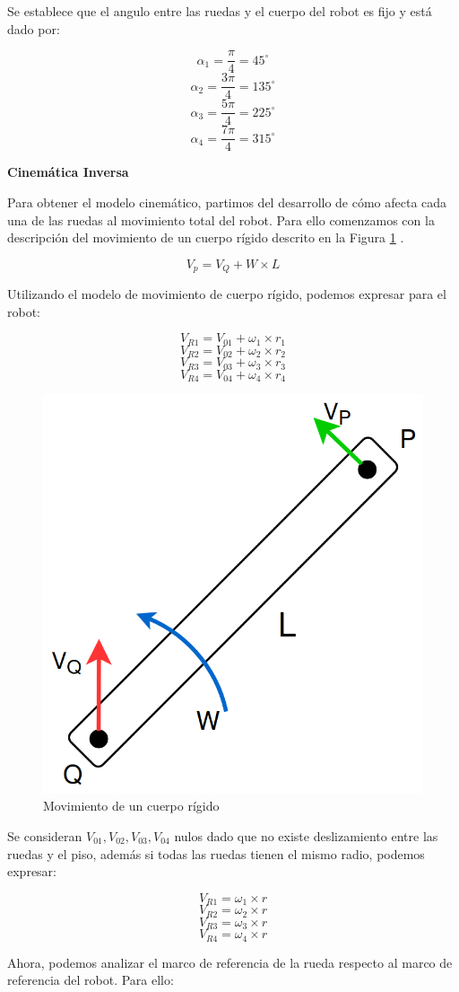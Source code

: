Se establece que el angulo entre las ruedas y el cuerpo del robot es fijo y está dado por:

$$ \alpha_1 = \frac{\pi}{4} = 45^{\circ} $$
$$ \alpha_2 = \frac{3\pi}{4} = 135^{\circ} $$
$$ \alpha_3 = \frac{5\pi}{4} = 225^{\circ} $$
$$ \alpha_4 = \frac{7\pi}{4} = 315^{\circ} $$

\newpage
\textbf{Cinemática Inversa} \mbox{} \vspace{8pt}

Para obtener el modelo cinemático, partimos del desarrollo de cómo afecta cada una de las ruedas al movimiento total del robot. Para ello comenzamos con la descripción del movimiento de un cuerpo rígido descrito en la Figura \ref{fig:movimientocuerporigido} \cite{islassistcontrolomni}.

$$ V_p = V_Q + W \times L $$

Utilizando el modelo de movimiento de cuerpo rígido, podemos expresar para el robot:

$$ V_{R1} = V_{01} + \omega_1 \times r_1 $$
$$ V_{R2} = V_{02} + \omega_2 \times r_2 $$
$$ V_{R3} = V_{03} + \omega_3 \times r_3 $$
$$ V_{R4} = V_{04} + \omega_4 \times r_4 $$

\begin{figure}[H]
    \centering
    \includegraphics[width=0.3\linewidth]{images/movimiento_cuerpo_rigido.png}
    \caption{Movimiento de un cuerpo rígido}
    \label{fig:movimientocuerporigido}
\end{figure}

Se consideran $ V_{01}, V_{02}, V_{03}, V_{04} $ nulos dado que no existe deslizamiento entre las ruedas y el piso, además si todas las ruedas tienen el mismo radio, podemos expresar:

$$ V_{R1} = \omega_1 \times r $$
$$ V_{R2} = \omega_2 \times r $$
$$ V_{R3} = \omega_3 \times r $$
$$ V_{R4} = \omega_4 \times r $$

Ahora, podemos analizar el marco de referencia de la rueda respecto al marco de referencia del robot. Para ello:

